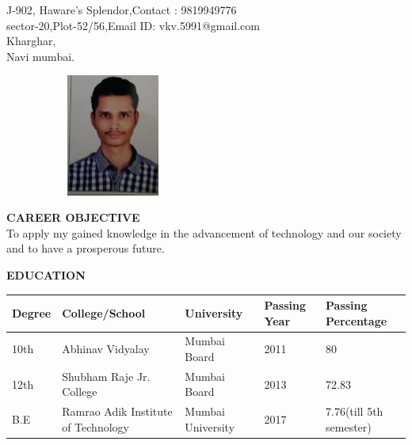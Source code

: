 \documentclass[a4paper]{article}
\begin{document}


\begin{flushleft}
{J-902, Haware's Splendor,\hfill{Contact : 9819949776} \\sector-20,Plot-52/56,\hfill{Email ID: vkv.5991@gmail.com}\\ Kharghar, \\Navi mumbai.}
\end{flushleft}


\begin{figure}[h]
\begin{flushright}
\graphicspath{ {images/} }
\includegraphics[width=5cm, height=4cm, angle = 270]{cv_pic}
\end{flushright}
\end{figure}


\begin{flushleft}
\textbf {CAREER OBJECTIVE}\\
To apply my gained knowledge in the advancement of technology and our society and to have a prosperous future.
\end{flushleft}

\begin{flushleft}
\textbf { EDUCATION}
\vspace{-5mm}
\begin{center}
\begin{tabular}{ | m{2cm} | m{2.5cm}| m{2cm} | m{2.5cm}| m{3cm} | } 
\hline
Degree& College/School & University & Passing Year & Passing Percentage \\ 
\hline
10th & Abhinav Vidyalay & Mumbai Board & 2011 & 80 \\ 
\hline
12th & Shubham Raje Jr. College & Mumbai Board & 2013 &72.83 \\ 
\hline
B.E & Ramrao Adik Institute of Technology & Mumbai University &2017 & 7.76(till 5th semester) \\
\hline
\end{tabular}
\end{center}
\end{flushleft}
\end{document}
